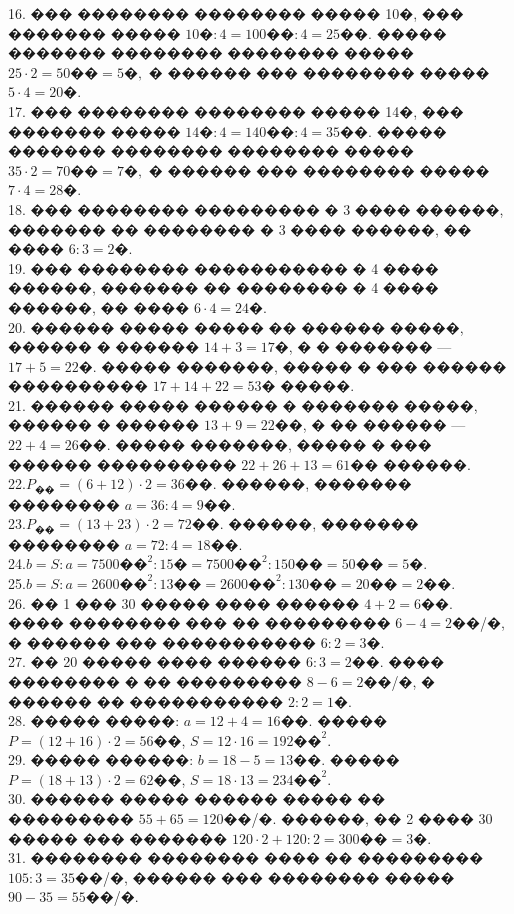\documentclass[12pt]{article}
\begin{document}
16. ��� �������� �������� ����� 10�, ��� ������� ����� $10\text{�}:4=100\text{��}:4=25$��. ����� ������� �������� �������� ����� $25\cdot2=50\text{��}=5\text{�},$ � ������ ��� �������� ����� $5\cdot4=20$�.\\
17. ��� �������� �������� ����� 14�, ��� ������� ����� $14\text{�}:4=140\text{��}:4=35$��. ����� ������� �������� �������� ����� $35\cdot2=70\text{��}=7\text{�},$ � ������ ��� �������� ����� $7\cdot4=28$�.\\
18. ��� �������� ��������� � 3 ���� ������, ������� �� �������� � 3 ���� ������, �� ���� $6:3=2$�.\\
19. ��� �������� ����������� � 4 ���� ������, ������� �� �������� � 4 ���� ������, �� ���� $6\cdot4=24$�.\\
20. ������ ����� ����� �� ������ �����, ������ � ������ $14+3=17$�, � � ������� --- $17+5=22$�. ����� �������, ����� � ��� ������ ���������� $17+14+22=53$� �����.\\
21. ������ ����� ������ � ������� �����, ������ � ������ $13+9=22$��, � �� ������ --- $22+4=26$��. ����� �������, ����� � ��� ������ ���������� $22+26+13=61$�� ������.\\
22.$P_{\text{��}}=(6+12)\cdot2=36$��. ������, ������� �������� $a=36:4=9$��.\\
23.$P_{\text{��}}=(13+23)\cdot2=72$��. ������, ������� �������� $a=72:4=18$��.\\
24.$b=S:a=7500\text{��}^2:15\text{�}=7500\text{��}^2:150\text{��}=50\text{��}=5$�.\\
25.$b=S:a=2600\text{��}^2:13\text{��}=2600\text{��}^2:130\text{��}=20\text{��}=2$��.\\
26. �� 1 ��� 30 ����� ���� ������ $4+2=6$��. ���� �������� ��� �� ��������� $6-4=2$��/�, � ������ ��� ����������� $6:2=3$�.\\
27. �� 20 ����� ���� ������ $6:3=2$��. ���� �������� � �� ��������� $8-6=2$��/�, � ������ �� ����������� $2:2=1$�.\\
28. ����� �����: $a=12+4=16$��. ����� $P=(12+16)\cdot2=56$��, $S=12\cdot16=192\text{��}^2.$\\
29. ����� ������: $b=18-5=13$��. ����� $P=(18+13)\cdot2=62$��, $S=18\cdot13=234\text{��}^2.$\\
30. ������ ����� ������ ����� �� ��������� $55+65=120$��/�. ������, �� 2 ���� 30 ����� ��� ������� $120\cdot2+120:2=300\text{��}=3$�.\\
31. �������� �������� ���� �� ��������� $105:3=35$��/�, ������ ��� �������� ����� $90-35=55$��/�.\\
\end{document}
